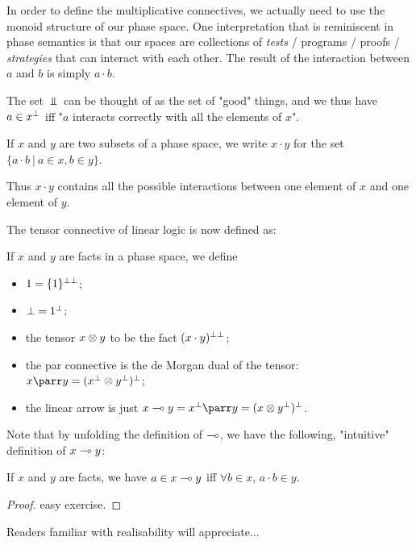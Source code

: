 In order to define the multiplicative connectives, we actually need to
use the monoid structure of our phase space. One interpretation that is
reminiscent in phase semantics is that our spaces are collections of
\emph{tests} / programs / proofs / \emph{strategies} that can interact
with each other. The result of the interaction between \(a\) and \(b\)
is simply \(a\cdot b\).

The set \(\Bot\) can be thought of as the set of "good" things, and we
thus have \(a\in x^\bot\) iff "\(a\) interacts correctly with all the
elements of \(x\)".

\begin{definition}
If $x$ and $y$ are two subsets of a phase space, we write $x\cdot y$ for the set $\{a\cdot b\ |\ a\in x, b\in y\}$.
\end{definition}

Thus \(x\cdot y\) contains all the possible interactions between one
element of \(x\) and one element of \(y\).

The tensor connective of linear logic is now defined as:

\begin{definition}
If $x$ and $y$ are facts in a phase space, we define
\begin{itemize}
  \item $1 = \{1\}^{\bot\bot}$;
  \item $\bot = 1^\bot$;
  \item the tensor $x\otimes y$ to be the fact $(x\cdot y)^{\bot\bot}$;
  \item the par connective is the de Morgan dual of the tensor: $x\parr y = (x\orth \tens y\orth)\orth$;
  \item the linear arrow is just $x\limp y = x\orth\parr y = (x\tens y\orth)\orth$.
  \end{itemize}
\end{definition}

Note that by unfolding the definition of \(\multimap\), we have the
following, "intuitive" definition of \(x\multimap y\):

\begin{lemma}
If $x$ and $y$ are facts, we have $a\in x\multimap y$ iff $\forall b\in x,\,a\cdot b\in y$.
\end{lemma}

\begin{proof}
easy exercise.
\end{proof}

Readers familiar with realisability will appreciate...

